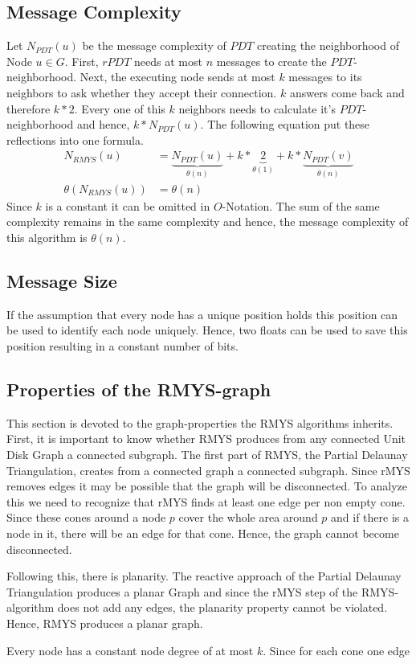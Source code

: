 \subsection{Message Complexity}
\label{message_complexity}
Let $N_{PDT}(u) $ be the message complexity of $PDT $ creating the neighborhood of Node $u \in G$.
First, $rPDT $ needs at most $n $ messages to create the $PDT $-neighborhood.
Next, the executing node sends at most $k $ messages to its neighbors to ask whether they accept their connection.
$k $ answers come back and therefore $k * 2 $.
Every one of this $k $ neighbors needs to calculate it's $PDT $-neighborhood and hence, $k*N_{PDT}(u) $.
The following equation put these reflections into one formula.
\begin{equation*}
\begin{split}
N_{RMYS}(u) &= \underbrace{N_{PDT}(u)}_{\theta (n)} +k *\underbrace{2}_{\theta (1)} + k*\underbrace{N_{PDT}(v)}_{\theta (n)} \\
\theta (N_{RMYS}(u)) &= \theta (n) 
\end{split}
\end{equation*}
Since $k $ is a constant it can be omitted in $O $-Notation.
The sum of the same complexity remains in the same complexity and hence, the message complexity of this algorithm is $\theta (n) $.

\subsection{Message Size}
If the assumption that every node has a unique position holds this position can be used to identify each node uniquely.
Hence, two floats can be used to save this position resulting in a constant number of bits.

\subsection{Properties of the RMYS-graph}
This section is devoted to the graph-properties the RMYS algorithms inherits.
First, it is important to know whether RMYS produces from any connected Unit Disk Graph a connected subgraph.
The first part of RMYS, the Partial Delaunay Triangulation, creates from a connected graph a connected subgraph.
Since rMYS removes edges it may be possible that the graph will be disconnected.
To analyze this we need to recognize that rMYS finds at least one edge per non empty cone.
Since these cones around a node $p $ cover the whole area around $p $ and if there is a node in it, there will be an edge for that cone.
Hence, the graph cannot become disconnected. 

Following this, there is planarity.
The reactive approach of the Partial Delaunay Triangulation produces a planar Graph and since the rMYS step of the RMYS-algorithm does not add any edges, the planarity property cannot be violated.
Hence, RMYS produces a planar graph.

Every node has a constant node degree of at most $k $.
Since for each cone one edge


